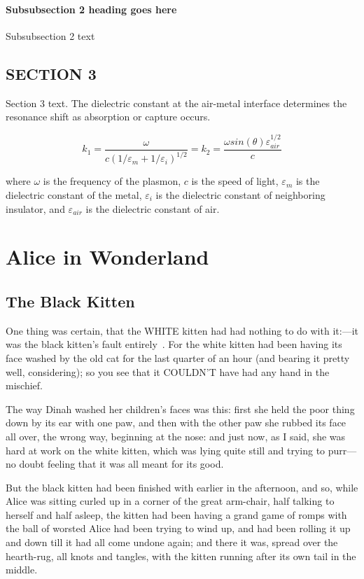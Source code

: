 \documentclass[phd,tocprelim]{cornell}
\begin{document}
\subsubsection{Subsubsection 2 heading goes here}
Subsubsection 2 text

\section{SECTION 3}
Section 3 text. The dielectric constant at the air-metal interface
determines the resonance shift as absorption or capture occurs.

\begin{equation}
k_1=\frac{\omega }{c({1/\varepsilon_m + 1/\varepsilon_i})^{1/2}}=k_2=\frac{\omega
sin(\theta)\varepsilon_{air}^{1/2}}{c}
\end{equation}

\noindent
where $\omega$ is the frequency of the plasmon, $c$ is the speed of
light, $\varepsilon_m$ is the dielectric constant of the metal,
$\varepsilon_i$ is the dielectric constant of neighboring insulator,
and $\varepsilon_{air}$ is the dielectric constant of air.

\chapter{Alice in Wonderland}

\section{The Black Kitten}
  One thing was certain, that the WHITE kitten had had nothing to
do with it:---it was the black kitten's fault entirely~\cite{aiw}.  For the
white kitten had been having its face washed by the old cat for
the last quarter of an hour (and bearing it pretty well,
considering); so you see that it COULDN'T have had any hand in
the mischief.

  The way Dinah washed her children's faces was this:  first she
held the poor thing down by its ear with one paw, and then with
the other paw she rubbed its face all over, the wrong way,
beginning at the nose:  and just now, as I said, she was hard at
work on the white kitten, which was lying quite still and trying
to purr---no doubt feeling that it was all meant for its good.

  But the black kitten had been finished with earlier in the
afternoon, and so, while Alice was sitting curled up in a corner
of the great arm-chair, half talking to herself and half asleep,
the kitten had been having a grand game of romps with the ball of
worsted Alice had been trying to wind up, and had been rolling it
up and down till it had all come undone again; and there it was,
spread over the hearth-rug, all knots and tangles, with the
kitten running after its own tail in the middle.
\end{document}
